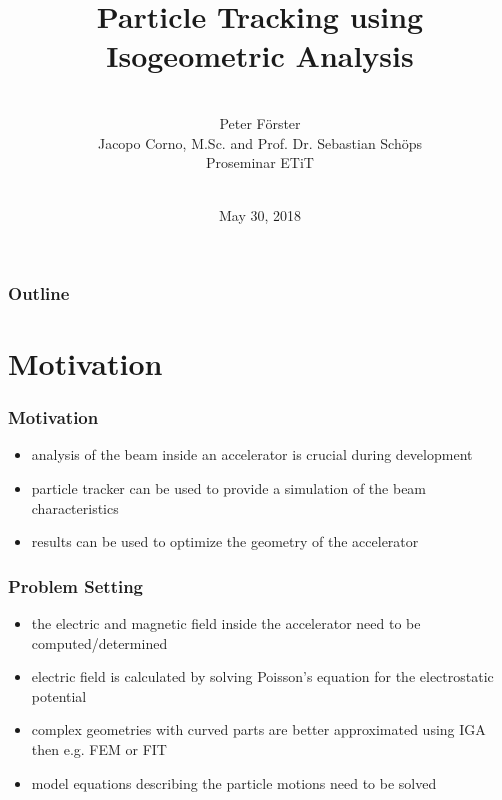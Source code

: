 \documentclass[colorbacktitle,inverttitle,landscape,presentation,
	english,
	aspectratio=43, %
	accentcolor=tud9b, %
]{tudbeamer}
\date{May 30, 2018}
\title{Particle Tracking using Isogeometric Analysis}
\subtitle{\\[0.3\baselineskip]
	Peter Förster\\[0.3\baselineskip]
{\small Jacopo Corno, M.Sc. and Prof. Dr. Sebastian Schöps}\\
[0.3\baselineskip]
{\tiny Proseminar ETiT}\\[0.3em]
	\mbox{\scriptsize}~}
\institute[TU Darmstadt | Fachbereich 18 | Institut Theorie Elektromagnetischer Felder]{Institut für Theorie Elektromagnetischer Felder, TU Darmstadt}
\begin{document}
	
\begin{titleframe}
	\end{titleframe}
	
\begin{frame}
	\frametitle{Outline}
	\tableofcontents%
\end{frame}
	
	
\section{Motivation}
\begin{frame}
\frametitle{Motivation}
	\begin{itemize}
	\item analysis of the beam inside an accelerator is crucial during development
	
	\item particle tracker can be used to provide a simulation of the beam characteristics
	
	\item results can be used to optimize the geometry of the accelerator
	\end{itemize}
\end{frame}

\begin{frame}
\frametitle{Problem Setting}
	\begin{itemize}
	\item the electric and magnetic field inside the accelerator need to be computed/determined 
	
	\item electric field is calculated by solving Poisson's equation for the electrostatic potential
	
	\item complex geometries with curved parts are better approximated using IGA then e.g. FEM or FIT
	
	\item model equations describing the particle motions need to be solved
	\end{itemize}
\end{frame}
		
\end{document}
